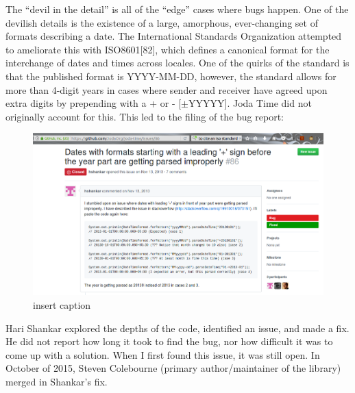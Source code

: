 The “devil in the detail” is all of the “edge” cases where bugs happen. One of the devilish details is the existence of a large, amorphous, ever-changing set of formats describing a date. The International Standards Organization attempted to ameliorate this with ISO8601[82], which defines a canonical format for the interchange of dates and times across locales. One of the quirks of the standard is that the published format is YYYY-MM-DD, however, the standard allows for more than 4-digit years in cases where sender and receiver have agreed upon extra digits by prepending with a + or - [$\pm$YYYYY].
Joda Time did not originally account for this. This led to the filing of the bug report:

\begin{figure}[H]
	\centering
	\includegraphics[width=\linewidth]{bugreport}
	\caption{insert caption}
\end{figure}

Hari Shankar explored the depths of the code, identified an issue, and made a fix. He did not report how long it took to find the bug, nor how difficult it was to come up with a solution. When I first found this issue, it was still open. 
In October of 2015, Steven Colebourne (primary author/maintainer of the library) merged in Shankar’s fix.

